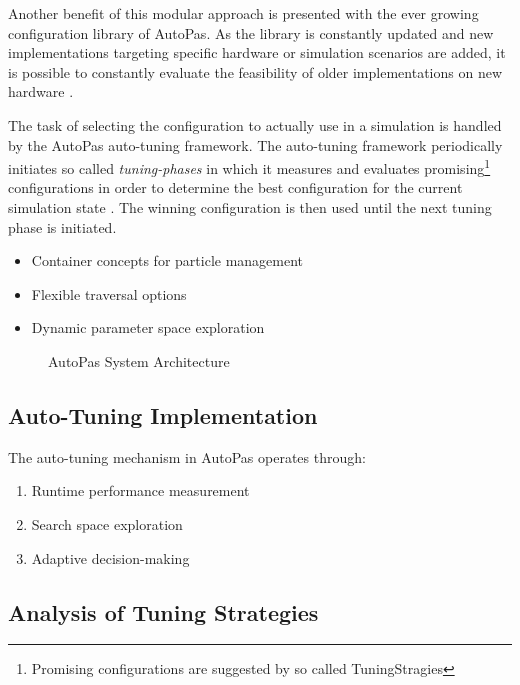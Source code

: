\documentclass[conference]{IEEEtran}
\begin{document}
Another benefit of this modular approach is presented with the ever growing configuration library of AutoPas. As the library is constantly updated and new implementations targeting specific hardware or simulation scenarios are added,
it is possible to constantly evaluate the feasibility of older implementations on new hardware \cite{Tchipev2020}.

The task of selecting the configuration to actually use in a simulation is handled by the AutoPas auto-tuning framework. The auto-tuning framework periodically initiates so called \textit{tuning-phases} in which it measures and evaluates promising\footnote{Promising configurations are suggested by so called TuningStragies} configurations in order to determine the best configuration for the current simulation state \cite{Gratl2019AutoPas}. The winning configuration is then used until the next tuning phase is initiated.


\begin{itemize}
    \item Container concepts for particle management
    \item Flexible traversal options
    \item Dynamic parameter space exploration
\end{itemize}

\begin{figure}[!t]
    \centering
    \caption{AutoPas System Architecture}
    \label{fig_architecture}
\end{figure}

\subsection{Auto-Tuning Implementation}
The auto-tuning mechanism in AutoPas operates through:

\begin{enumerate}
    \item Runtime performance measurement
    \item Search space exploration
    \item Adaptive decision-making
\end{enumerate}

\subsection{Analysis of Tuning Strategies}
\end{document}
